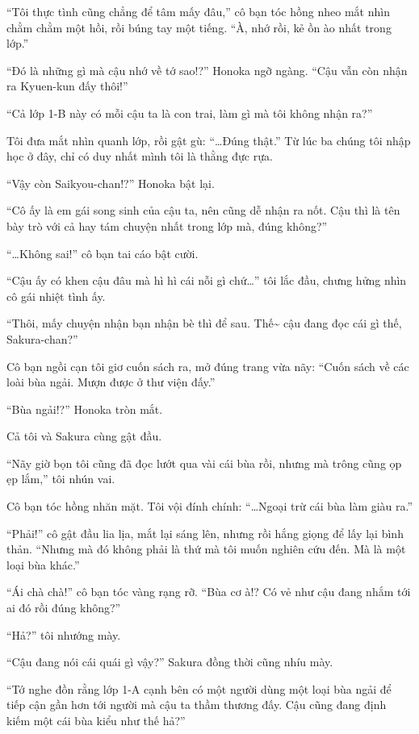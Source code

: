 \documentclass[../main.tex]{subfiles}
\begin{document}
``Tôi thực tình cũng chẳng để tâm mấy đâu,'' cô bạn tóc hồng nheo mắt nhìn chằm chằm một hồi, rồi búng tay một tiếng. ``À, nhớ rồi, kẻ ồn ào nhất trong lớp.''

``Đó là những gì mà cậu nhớ về tớ sao!?'' Honoka ngỡ ngàng. ``Cậu vẫn còn nhận ra Kyuen-kun đấy thôi!''

``Cả lớp 1-B này có mỗi cậu ta là con trai, làm gì mà tôi không nhận ra?''

Tôi đưa mắt nhìn quanh lớp, rồi gật gù: ``\dots Đúng thật.'' Từ lúc ba chúng tôi nhập học ở đây, chỉ có duy nhất mình tôi là thằng đực rựa.

``Vậy còn Saikyou-chan!?'' Honoka bật lại.

``Cô ấy là em gái song sinh của cậu ta, nên cũng dễ nhận ra nốt. Cậu thì là tên bày trò với cả hay tám chuyện nhất trong lớp mà, đúng không?''

``\dots Không sai!'' cô bạn tai cáo bật cười.

``Cậu ấy có khen cậu đâu mà hì hì cái nỗi gì chứ\dots'' tôi lắc đầu, chưng hửng nhìn cô gái nhiệt tình ấy.

``Thôi, mấy chuyện nhận bạn nhận bè thì để sau. Thế\~{} cậu đang đọc cái gì thế, Sakura-chan?''

Cô bạn ngồi cạn tôi giơ cuốn sách ra, mở đúng trang vừa nãy: ``Cuốn sách về các loài bùa ngải. Mượn được ở thư viện đấy.''

``Bùa ngải!?'' Honoka tròn mắt.

Cả tôi và Sakura cùng gật đầu.

``Nãy giờ bọn tôi cũng đã đọc lướt qua vài cái bùa rồi, nhưng mà trông cũng ọp ẹp lắm,'' tôi nhún vai.

Cô bạn tóc hồng nhăn mặt. Tôi vội đính chính: ``\dots Ngoại trừ cái bùa làm giàu ra.''

``Phải!'' cô gật đầu lia lịa, mắt lại sáng lên, nhưng rồi hắng giọng để lấy lại bình thản. ``Nhưng mà đó không phải là thứ mà tôi muốn nghiên cứu đến. Mà là một loại bùa khác.''

``Ái chà chà!'' cô bạn tóc vàng rạng rỡ. ``Bùa cơ à!? Có vẻ như cậu đang nhắm tới ai đó rồi đúng không?''

``Hả?'' tôi nhướng mày.

``Cậu đang nói cái quái gì vậy?'' Sakura đồng thời cũng nhíu mày.

``Tớ nghe đồn rằng lớp 1-A cạnh bên có một người dùng một loại bùa ngải để tiếp cận gần hơn tới người mà cậu ta thầm thương đấy. Cậu cũng đang định kiếm một cái bùa kiểu như thế hả?''
\end{document}
